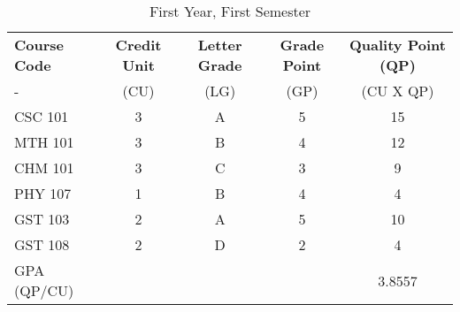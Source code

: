 \documentclass{article}
\begin{document}
	\begin{table}[h!]
		\begin{center}
			\caption{First Year, First Semester}
			\label{tab:table1}
			\begin{tabular}{l|c|c|c|c}
				\textbf{Course Code} & \textbf{Credit Unit} & \textbf{Letter Grade} & \textbf{Grade Point} & \textbf{Quality Point (QP)}\\
				- & (CU) & (LG) & (GP) & (CU X QP)\\
				\hline
				CSC 101 & 3 & A & 5 & 15\\
				MTH 101 & 3 & B & 4 & 12\\
				CHM 101 & 3 & C & 3 & 9\\
				PHY 107 & 1 & B & 4 & 4\\
				GST 103 & 2 & A & 5 & 10\\
				GST 108 & 2 & D & 2 & 4\\
				GPA (QP/CU) & & & & 3.8557\\
			\end{tabular}
		\end{center}
	\end{table}
\end{document}
